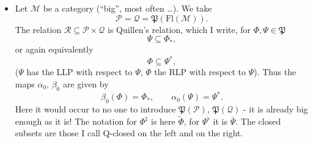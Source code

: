 \documentclass[11pt]{article}
\newcommand{\Fl}{\mathrm{Fl}}
\newcommand{\Pf}{\mathfrak{P}}
\begin{document}
\begin{itemize}[leftmargin=2.5em]
\item[6)] Let $\mathcal{M}$ be a category (``big'', most often \dots). We take
\[
\mathcal{P}=\mathcal{Q}=\Pf(\Fl(\mathcal{M})).
\]
The relation $\mathcal{R}\subseteq\mathcal{P}\times\mathcal{Q}$ is Quillen's relation, which I write, for $\Phi,\Psi\in\Pf$
\[
\Psi\subseteq\Phi_{*},
\]
or again equivalently
\[
\Phi\subseteq\Psi^{*},
\]
($\Psi$ has the LLP with respect to $\Psi$, $\Phi$ the RLP with respect to $\Psi$). Thus the maps $\alpha_0$, $\beta_0$ are given by %
\[
\beta_0(\Phi)=\Phi_{*},\qquad \alpha_0(\Psi)=\Psi^{*}.
\]
Here it would occur to no one to introduce $\Pf(\mathcal{P})$, $\Pf(\mathcal{Q})$ - it is already big enough as it is! The notation for $\Phi^{\natural}$ is here $\tilde{\Phi}$, for $\Psi^{\flat}$ it is $\bar{\Psi}$. The closed subsets are those I call Q-closed on the left and on the right.


\end{itemize}
\end{document}
